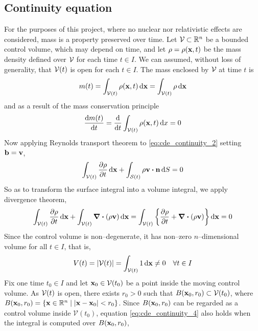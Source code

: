 
\subsection{Continuity equation}

For the purposes of this project, where no nuclear nor relativistic effects are considered, mass is a property preserved over time. Let $\mathcal{V}_{} \subset \mathbb{R}^n$ be a bounded control volume, which may depend on time, and let $\rho = \rho(\vb{x}, t)$ be the mass density defined over $\mathcal{V}_{}$ for each time $t \in I$. We can assumed, without loss of generality, that ${\mathcal{V}(t)}$ is open for each $t \in I$. The mass enclosed by $\mathcal{V}_{}$ at time $t$ is
\begin{equation}
	m(t) = \int_{\mathcal{V}(t)} \rho(\vb{x}, t) \dd{\vb{x}} = \int_{\mathcal{V}(t)} \rho \dd{\vb{x}}
\end{equation}
and as a result of the mass conservation principle
\begin{equation} \label{eq:cde_continuity_2}
	\frac{\dd m(t)}{\dd{t}} = 
	\frac{\dd}{\dd{t}} \int_{\mathcal{V}(t)} \rho(\vb{x}, t) \dd{x} = 0
\end{equation}
Now applying Reynolds transport theorem to \eqref{eq:cde_continuity_2} setting $\vb{b} = \vb{v}$,
\begin{equation}
	\int_\cvt \frac{\partial \rho}{\partial t} \dd{\vb{x}} + 
	\int_\cst \rho \vb{v} \vdot \vb{n} \dd{S} = 0
\end{equation}
So as to transform the surface integral into a volume integral, we apply divergence theorem,
\begin{equation} \label{eq:cde_continuity_4}
	\int_{\mathcal{V}(t)} \frac{\partial \rho}{\partial t} \dd{\vb{x}} + 
	\int_{\mathcal{V}(t)} \div(\rho \vb{v}) \dd{\vb{x}} = 
	\int_{\mathcal{V}(t)} \left\{ \frac{\partial \rho}{\partial t} + \div(\rho \vb{v}) \right\} \dd{\vb{x}} = 0
\end{equation}
Since the control volume is non--degenerate, it has non--zero $n$--dimensional volume for all $t \in I$, that is,
\begin{equation}
	V(t) = \abs{{\mathcal{V}(t)}} = \int_{\mathcal{V}(t)} 1 \dd{\vb{x}} \neq 0 \quad \forall t \in I
\end{equation}
Fix one time $t_0 \in I$ and let $\vb{x}_0 \in \mathcal{V}(t_0)$ be a point inside the moving control volume. As ${\mathcal{V}(t)}$ is open, there exists $r_0 > 0$ such that $B(\vb{x}_0, r_0) \subset \mathcal{V}(t_0)$, where $B(\vb{x}_0, r_0) = \{ \vb{x} \in \mathbb{R}^n \mid \abs{\vb{x} - \vb{x}_0} < r_0 \}$. Since $B(\vb{x}_0, r_0)$ can be regarded as a control volume inside $\mathcal{V}(t_0)$, equation \eqref{eq:cde_continuity_4} also holds when the integral is computed over $B(\vb{x}_0, r_0)$, \ie
